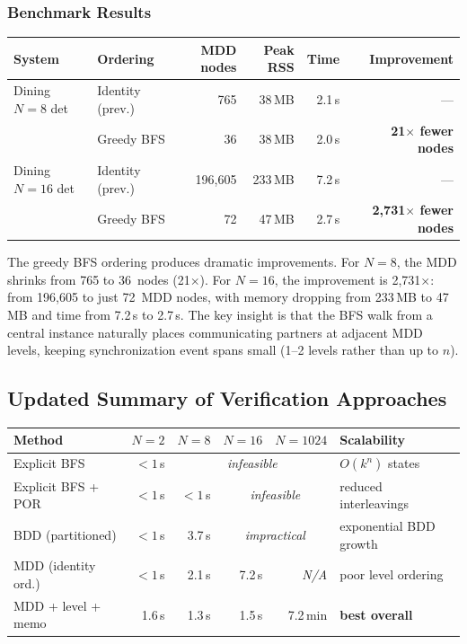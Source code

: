 \documentclass[11pt]{article}
\begin{document}
\subsubsection{Benchmark Results}

\begin{center}
\begin{tabular}{llrrrr}
\toprule
\textbf{System} & \textbf{Ordering} & \textbf{MDD nodes} & \textbf{Peak RSS} & \textbf{Time} & \textbf{Improvement} \\
\midrule
Dining $N{=}8$ det  & Identity (prev.)  & 765     & 38\,MB  & 2.1\,s & --- \\
                     & Greedy BFS        & 36      & 38\,MB  & 2.0\,s & \textbf{21$\times$ fewer nodes} \\
\midrule
Dining $N{=}16$ det & Identity (prev.)  & 196,605 & 233\,MB & 7.2\,s & --- \\
                     & Greedy BFS        & 72      & 47\,MB  & 2.7\,s & \textbf{2,731$\times$ fewer nodes} \\
\bottomrule
\end{tabular}
\end{center}

The greedy BFS ordering produces dramatic improvements.  For $N = 8$,
the MDD shrinks from 765 to 36~nodes (21$\times$).  For $N = 16$,
the improvement is 2,731$\times$: from 196,605 to just 72~MDD nodes,
with memory dropping from 233\,MB to 47\,MB and time from 7.2\,s to
2.7\,s.  The key insight is that the BFS walk from a central instance
naturally places communicating partners at adjacent MDD levels, keeping
synchronization event spans small (1--2 levels rather than up to $n$).

\subsection{Updated Summary of Verification Approaches}

\begin{center}
\begin{tabular}{lrrrrl}
\toprule
\textbf{Method} & \textbf{$N{=}2$} & \textbf{$N{=}8$} & \textbf{$N{=}16$} & \textbf{$N{=}1024$} & \textbf{Scalability} \\
\midrule
Explicit BFS         & $< 1$\,s & \multicolumn{3}{c}{\textit{infeasible}} & $O(k^n)$ states \\
Explicit BFS + POR   & $< 1$\,s & $< 1$\,s & \multicolumn{2}{c}{\textit{infeasible}} & reduced interleavings \\
BDD (partitioned)    & $< 1$\,s & 3.7\,s   & \multicolumn{2}{c}{\textit{impractical}} & exponential BDD growth \\
MDD (identity ord.)  & $< 1$\,s & 2.1\,s   & 7.2\,s & \textit{N/A} & poor level ordering \\
MDD + level + memo   & 1.6\,s   & 1.3\,s   & 1.5\,s & 7.2\,min & \textbf{best overall} \\
\bottomrule
\end{tabular}
\end{center}
\end{document}
